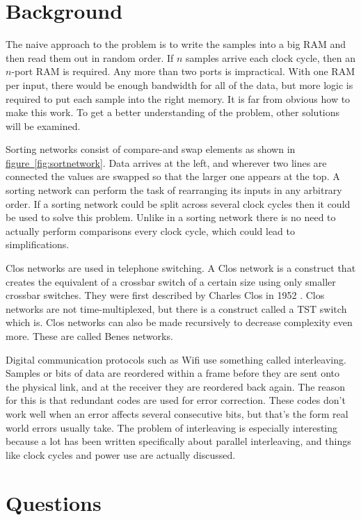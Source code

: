 \documentclass[
	utf8,
	largesmallcaps,
	intlimits,
	widermath,
	sharecounter,
	nobreak,
	definition=marks,
	numbers,
	noparts
]{rtthesis}
\newcommand{\figureref}[1]{\hyperref[#1]{figure~\ref*{#1}}}
\begin{document}
\section{Background}

The naive approach to the problem is to write the samples into a big RAM and
then read them out in random order. If $n$ samples arrive each clock cycle,
then an $n$-port RAM is required. Any more than two ports is impractical. With
one RAM per input, there would be enough bandwidth for all of the data, but
more logic is required to put each sample into the right memory.  It is far
from obvious how to make this work. To get a better understanding of the
problem, other solutions will be examined.

Sorting networks consist of compare-and swap elements as shown in
\figureref{fig:sortnetwork}. Data arrives at the left, and wherever two lines
are connected the values are swapped so that the larger one appears at the top.
A sorting network can perform the task of rearranging its inputs in any
arbitrary order. If a sorting network could be split across several clock
cycles then it could be used to solve this problem. Unlike in a sorting network
there is no need to actually perform comparisons every clock cycle, which could
lead to simplifications.

Clos networks are used in telephone switching. A Clos network is a construct
that creates the equivalent of a crossbar switch of a certain size using only
smaller crossbar switches. They were first described by Charles Clos in 1952
\cite{clos}. Clos networks are not time-multiplexed, but there is a construct
called a TST switch
which is. Clos networks can also be made recursively to decrease complexity
even more. These are called Benes networks.

Digital communication protocols such as Wifi use something called interleaving.
Samples or bits of data are reordered within a frame before they are sent onto
the physical link, and at the receiver they are reordered back again. The
reason for this is that redundant codes are used for error correction. These
codes don't work well when an error affects several consecutive bits, but
that's the form real world errors usually take. The problem of interleaving is
especially interesting because a lot has been written specifically about
parallel interleaving, and things like clock cycles and power use are actually
discussed.

\section{Questions}
\end{document}
